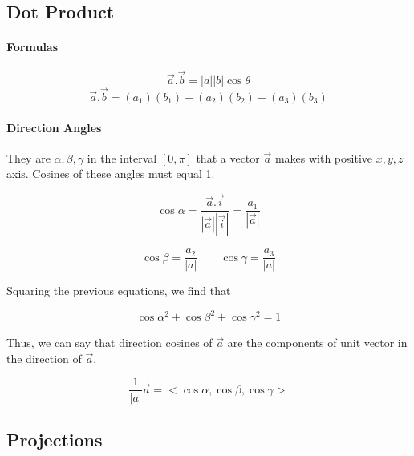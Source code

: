 \documentclass{article}
\begin{document}
\newpage

\subsection{Dot Product}

\paragraph{Formulas}

\begin{equation}
	\vec{a} . \vec{b} = |a||b| \cos{\theta} 
\end{equation}
\begin{equation}
	\vec{a} . \vec{b} = (a_1)(b_1) + (a_2)(b_2) + (a_3)(b_3)
\end{equation}

\paragraph{Direction Angles}
They are $\alpha, \beta, \gamma$ in the interval $[0,\pi]$ that a vector $\vec{a}$ makes with positive $x,y,z$ axis. Cosines of these angles must equal 1.

\begin{equation}
	\cos{\alpha} = \frac{\vec{a} . \vec{i}}{|\vec{a}| |\vec{i}|} = \frac{a_1}{|\vec{a}|}
\end{equation}

\begin{equation*}
	\cos{\beta} = \frac{a_2}{|a|} \qquad \cos{\gamma} = \frac{a_3}{|a|}	
\end{equation*}

Squaring the previous equations, we find that

\begin{equation}
	\cos{\alpha}^2 + \cos{\beta}^2 + \cos{\gamma}^2 = 1
\end{equation}

Thus, we can say that direction cosines of $\vec{a}$ are the components of unit vector in the direction of $ \vec{a}$.

\begin{equation}
	\frac{1}{|a|} \vec{a} = <\cos{\alpha} , \cos{\beta} , \cos{\gamma}>
\end{equation}

\noindent\hrulefill 

\newpage

\subsection{Projections}
\end{document}
